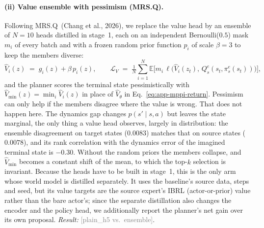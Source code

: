 \documentclass{article} %
\newcommand{\ph}[1]{\textcolor{gray}{#1}}   %
\begin{document}
\paragraph{(ii) Value ensemble with pessimism (MRS.Q).}
Following MRS.Q~(Chang et al., 2026), %
we replace the value head by an ensemble of $N=10$ heads distilled in stage~1, each
on an independent Bernoulli($0.5$) mask $m_i$ of every batch and with a frozen
random prior function $p_i$ of scale $\beta=3$ to keep the members diverse:
\begin{equation}
\hat V_i(z) \;=\; g_i(z) + \beta\, p_i(z), \qquad
\mathcal{L}_{V} \;=\; \tfrac{1}{N}\sum_{i=1}^{N}
\mathbb{E}\big[m_i\, \ell\big(\hat V_i(z_{t}),\, Q^e_s(s_t, \pi^e_s(s_t))\big)\big],
\end{equation}
and the planner scores the terminal state pessimistically with
$\hat V_{\min}(z) = \min_{i} \hat V_i(z)$ in place of $\hat V_\theta$ in
Eq.~\ref{eq:app-mppi-return}. Pessimism can only help if the members disagree
where the value is wrong. That does not happen here. The dynamics gap changes
$p(s' \mid s,a)$ but leaves the state marginal, the only thing a value head
observes, largely in distribution: the ensemble disagreement on target states
($0.0083$) matches that on source states ($0.0078$), and its rank correlation
with the dynamics error of the imagined terminal state is $-0.30$. Without the
random priors the members collapse, and $\hat V_{\min}$ becomes a constant shift
of the mean, to which the top-$k$ selection is invariant.
Because the heads have to be built in stage~1, this is the only arm whose world
model is distilled separately. It uses the baseline's source data, steps and seed,
but its value targets are the source expert's IBRL (actor-or-prior) value rather
than the bare actor's; since the separate distillation also changes the encoder and
the policy head, we additionally report the planner's net gain over its own proposal. \emph{Result:} \ph{[plain\_h5 vs.\ ensemble]}.
\end{document}

